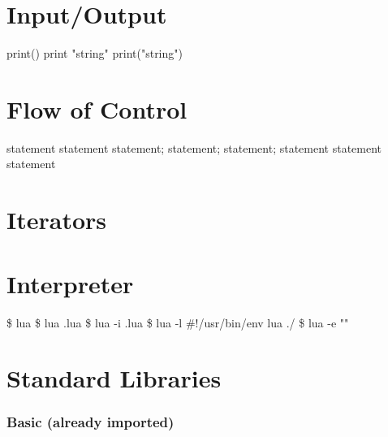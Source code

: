 \documentclass{refcard}
\begin{document}
\section{Input/Output}

\begin{ldesc}
	    print()
	 print "string" \li %
	                                  print("string")
\end{ldesc}


\section{Flow of Control}

\begin{ldesc}
	  statement \li
	                                    statement
	  statement; \li
	                                      statement;
	  statement; statement
	 statement statement
\end{ldesc}


\section{Iterators}




\section{Interpreter}

\begin{ldesc}
	   \$ lua
	           \$ lua .lua
	 \$ lua -i .lua
	 \$ lua -l
	        \#!/usr/bin/env lua
	 ./
	 \$ lua -e ""
\end{ldesc}


\pagebreak
\section{Standard Libraries}

\subsubsection{Basic (already imported)}
\end{document}

